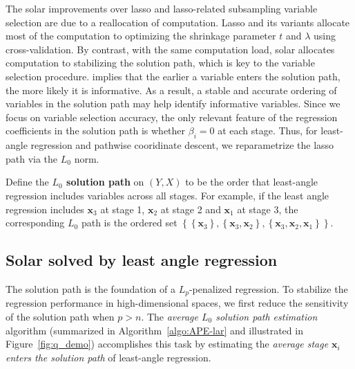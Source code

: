 \documentclass[11pt,review,authoryear]{elsarticle}
\begin{document}
The solar improvements over lasso and lasso-related subsampling variable selection are due to a reallocation of computation. Lasso and its variants allocate most of the computation to optimizing the shrinkage parameter $t$ and $\lambda$ using cross-validation. By contrast, with the same computation load, solar allocates computation to stabilizing the solution path, which is key to the variable selection procedure. \citet[Theorem~2]{zhang09} implies that the earlier a variable enters the solution path, the more likely it is informative. As a result, a stable and accurate ordering of variables in the solution path may help identify informative variables. Since we focus on variable selection accuracy, the only relevant feature of the regression coefficients in the solution path is whether $\beta_i = 0$ at each stage. Thus, for least-angle regression and pathwise cooridinate descent, we reparametrize the lasso path via the $L_0$ norm.
%
\begin{definition}
  Define the \textbf{$L_0$ solution path} on $\left( Y, X \right)$ to be the order that least-angle regression includes variables across all stages. For example, if the least angle regression includes $\mathbf{x}_3$ at stage 1, $\mathbf{x}_2$ at stage 2 and $\mathbf{x}_1$ at stage 3, the corresponding $L_0$ path is the ordered set $\left\{ \left\{\mathbf{x}_3 \right\}, \left\{ \mathbf{x}_3, \mathbf{x}_2 \right\}, \left\{ \mathbf{x}_3, \mathbf{x}_2, \mathbf{x}_1 \right\} \right\}$.
  \label{def:solution_path}
\end{definition}

\subsection{Solar solved by least angle regression}

The solution path is the foundation of a $L_p$-penalized regression. To stabilize the regression performance in high-dimensional spaces, we first reduce the sensitivity of the solution path when $p > n$. The \emph{average $L_0$ solution path estimation} algorithm (summarized in Algorithm~\ref{algo:APE-lar} and illustrated in Figure~\ref{fig:q_demo}) accomplishes this task by estimating the \emph{average stage $\mathbf{x}_i$ enters the solution path} of least-angle regression.
\end{document}
